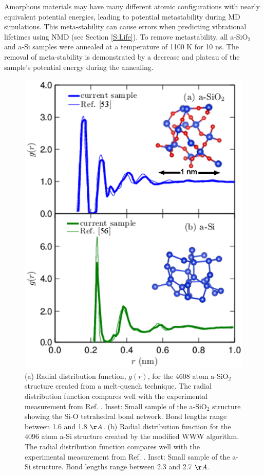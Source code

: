 \documentclass[aps,prb,twocolumn,superscriptaddress,footinbib,amsmath,amssymb,floatfix]{revtex4}
\begin{document}
Amorphous materials may have many different atomic 
configurations with nearly equivalent potential energies, 
leading to potential metastability during MD simulations.
\cite{feldman_numerical_1999,bernstein_structural_2006,he_heat_2011} 
This meta-stability can 
cause errors when predicting vibrational lifetimes using NMD 
(see Section \ref{S:Life}). 
To remove metastability, all a-SiO$_2$ and a-Si samples 
were annealed at a temperature of 
1100 K for 10 ns.\cite{feldman_numerical_1999,he_heat_2011} 
The removal of meta-stability is demonstrated 
by a decrease and plateau of the sample's potential energy 
during the annealing.  

\begin{figure}
\begin{center}
\includegraphics[scale=0.65]
{fig1.eps}
\vspace*{-5mm}
\end{center}
\caption{\label{FIG:supercell} 
(a) Radial distribution function, $g(r)$, for the 4608 atom a-SiO$_2$ 
structure created from a melt-quench technique. The radial distribution 
function compares well with the experimental measurement from 
Ref. . Inset: Small sample of the 
a-SiO$_2$ structure showing the Si-O tetrahedral 
bond network. Bond lengths range between 1.6 and 1.8 $\AA$.
(b) Radial distribution function for the 4096 atom a-Si 
structure created by the modified WWW 
algorithm. The radial distribution 
function compares well with the experimental measurement from 
Ref. . Inset: Small sample of 
the a-Si structure. Bond lengths range between 2.3 and 2.7 $\AA$. 
}
\end{figure}
\end{document}
